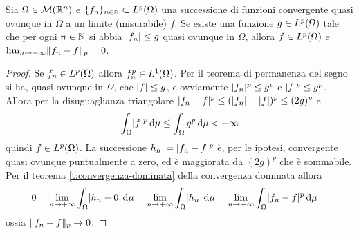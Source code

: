\begin{teorema} \label{t:convergenza-dominata-Lp}
    Sia $\Omega\in\mis(\R^n)$ e $\{f_n\}_{n\in\N}\subset\leb[p]{\Omega}$ una successione di funzioni convergente quasi ovunque in $\Omega$ a un limite (misurabile) $f$.
    Se esiste una funzione $g\in\leb[p]{\Omega}$ tale che per ogni $n\in\N$ si abbia $\abs{f_n}\le g$ quasi ovunque in $\Omega$, allora $f\in\leb[p]{\Omega}$ e $\lim_{n\to+\infty}\norm{f_n-f}_p=0$.
\end{teorema}
\begin{proof}
    Se $f_n\in\leb[p]{\Omega}$ allora $f_n^p\in\leb[1]{\Omega}$.
    Per il teorema di permanenza del segno si ha, quasi ovunque in $\Omega$, che $\abs{f}\le g$, e ovviamente $\abs{f_n}^p\le g^p$ e $\abs{f}^p\le g^p$.
    Allora per la disuguaglianza triangolare $\abs{f_n-f}^p\le(\abs{f_n}-\abs{f})^p\le(2g)^p$ e
    \begin{equation}
        \int_\Omega\abs{f}^p\,\dd\mu\le
        \int_\Omega g^p\,\dd\mu<
        +\infty
    \end{equation}
    quindi $f\in\leb[p]{\Omega}$.
    La successione $h_n\defeq\abs{f_n-f}^p$ è, per le ipotesi, convergente quasi ovunque puntualmente a zero, ed è maggiorata da $(2g)^p$ che è sommabile.
    Per il teorema \ref{t:convergenza-dominata} della convergenza dominata allora
    \begin{equation}
        0=\lim_{n\to+\infty}\int_\Omega\abs{h_n-0}\,\dd\mu=
        \lim_{n\to+\infty}\int_\Omega\abs{h_n}\,\dd\mu=
        \lim_{n\to+\infty}\int_\Omega\abs{f_n-f}^p\,\dd\mu=
    \end{equation}
    ossia $\norm{f_n-f}_p\to 0$.
\end{proof}

